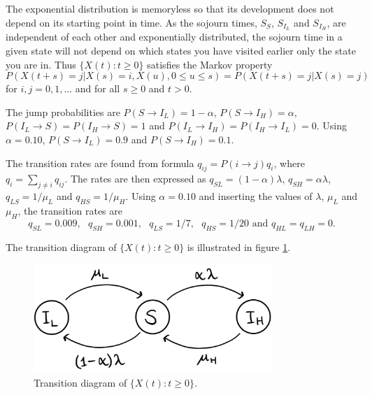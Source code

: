 
The exponential distribution is memoryless so that its development does not depend on its starting point in time. As the sojourn times, $S_S$, $S_{I_L}$ and $S_{I_H}$, are independent of each other and exponentially distributed, the sojourn time in a given state will not depend on which states you have visited earlier only the state you are in. Thus $\{X(t):t \geq 0 \}$  satisfies the Markov property
$$P(X(t+s)=j|X(s)=i, X(u), 0 \leq u \leq s)=P(X(t+s)=j|X(s)=j)$$ 
for $i,j = 0,1,...$ and for all $s \geq 0$ and $t >0 $.

The jump probabilities are $P(S \rightarrow I_L)= 1 - \alpha$, $P(S \rightarrow I_H)= \alpha$, $P(I_L \rightarrow S)= P(I_H \rightarrow S) = 1$ and $P(I_L \rightarrow I_H)= P(I_H \rightarrow I_L) = 0$. Using $\alpha = 0.10$, $P(S \rightarrow I_L)= 0.9$ and $P(S \rightarrow I_H)= 0.1$. 

The transition rates are found from formula $q_{ij} = P(i \rightarrow j ) q_i$, where $q_i = \sum_{j \neq i} q_{ij}$. The rates are then expressed as $q_{SL} = (1-\alpha)\lambda $, $q_{SH} = \alpha \lambda$, $q_{LS} = 1/\mu_L$ and $q_{HS} = 1/\mu_H$. Using $\alpha = 0.10$ and inserting the values of $\lambda$, $\mu_L$ and $\mu_H$, the transition rates are 
$$q_{SL} = 0.009,\text{ } q_{SH} = 0.001, \text{ } q_{LS} = 1/7, \text{ } q_{HS} = 1/20 \text{ and } q_{HL}=q_{LH}=0.$$

The transition diagram of $\{X(t):t \geq 0 \}$ is illustrated in figure \ref{transdiagramA}. 

\begin{figure}
    \centering
    \includegraphics[width=90mm]{TransDiag1A.png}
    \caption{Transition diagram of $\{X(t):t\geq0\}$.}
    \label{transdiagramA}
\end{figure}




